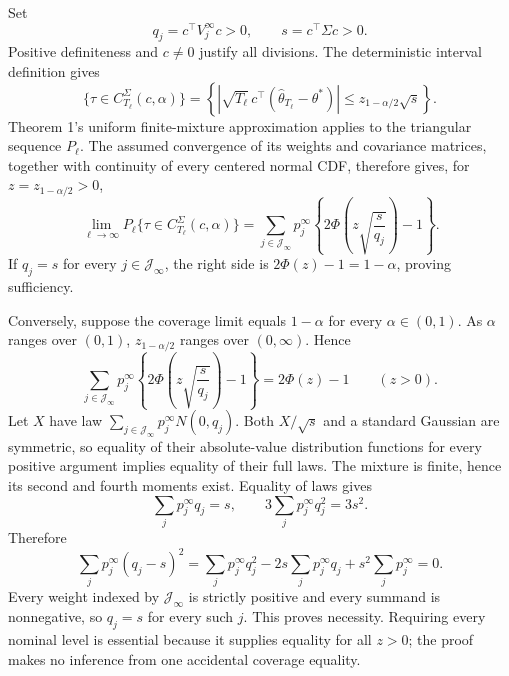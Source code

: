 Set
\[
 q_j=c^\top V_j^\infty c>0,
 \qquad s=c^\top\Sigma c>0.
\]
Positive definiteness and \(c\ne0\) justify all divisions. The deterministic interval definition gives
\[
 \{\tau\in C_{T_\ell}^{\Sigma}(c,\alpha)\}
 =\left\{\left|\sqrt{T_\ell}\,c^\top(\widehat\theta_{T_\ell}-\theta^*)\right|
 \le z_{1-\alpha/2}\sqrt s\right\}.
\]
Theorem 1's uniform finite-mixture approximation applies to the triangular sequence \(P_\ell\). The assumed convergence of its weights and covariance matrices, together with continuity of every centered normal CDF, therefore gives, for \(z=z_{1-\alpha/2}>0\),
\[
 \lim_{\ell\to\infty}P_\ell\{\tau\in C_{T_\ell}^{\Sigma}(c,\alpha)\}
 =\sum_{j\in\mathcal J_\infty}p_j^\infty
 \left\{2\Phi\left(z\sqrt{\frac{s}{q_j}}\right)-1\right\}.
\]
If \(q_j=s\) for every \(j\in\mathcal J_\infty\), the right side is \(2\Phi(z)-1=1-\alpha\), proving sufficiency.

Conversely, suppose the coverage limit equals \(1-\alpha\) for every \(\alpha\in(0,1)\). As \(\alpha\) ranges over \((0,1)\), \(z_{1-\alpha/2}\) ranges over \((0,\infty)\). Hence
\[
 \sum_{j\in\mathcal J_\infty}p_j^\infty
 \left\{2\Phi\left(z\sqrt{\frac{s}{q_j}}\right)-1\right\}
 =2\Phi(z)-1
 \qquad(z>0).
\]
Let \(X\) have law \(\sum_{j\in\mathcal J_\infty}p_j^\infty N(0,q_j)\). Both \(X/\sqrt s\) and a standard Gaussian are symmetric, so equality of their absolute-value distribution functions for every positive argument implies equality of their full laws. The mixture is finite, hence its second and fourth moments exist. Equality of laws gives
\[
 \sum_jp_j^\infty q_j=s,
 \qquad 3\sum_jp_j^\infty q_j^2=3s^2.
\]
Therefore
\[
 \sum_jp_j^\infty(q_j-s)^2
 =\sum_jp_j^\infty q_j^2-2s\sum_jp_j^\infty q_j+s^2\sum_jp_j^\infty=0.
\]
Every weight indexed by \(\mathcal J_\infty\) is strictly positive and every summand is nonnegative, so \(q_j=s\) for every such \(j\). This proves necessity. Requiring every nominal level is essential because it supplies equality for all \(z>0\); the proof makes no inference from one accidental coverage equality.